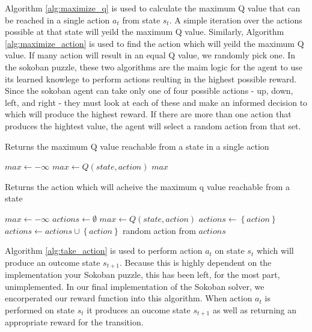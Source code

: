 \documentclass[times, 10pt,twocolumn]{article}
\begin{document}
Algorithm \ref{alg:maximize_q} is used to calculate the maximum Q value that can be reached in a single action $a_t$ from state $s_t$.  A simple iteration over the actions possible at that state will yeild the maximum Q value.  Similarly, Algorithm \ref{alg:maximize_action} is used to find the action which will yeild the maximum Q value.  If many action will result in an equal Q value, we randomly pick one.  In the sokoban puzzle, these two algorithms are the maim logic for the agent to use its learned knowlege to perform actions reulting in the highest possible reward.  Since the sokoban agent can take only one of four possible actions - up, down, left, and right - they must look at each of these and make an informed decision to which will produce the highest reward.  If there are more than one action that produces the hightest value, the agent will select a random action from that set.

\begin{algorithm}
  \caption{Returns the maximum Q value reachable from a state in a single action}
  \begin{algorithmic}[4]
      \State $max\gets -\infty$
          \State $max\gets Q(state, action)$
        \EndIf
      \EndFor
      \State \Return $max$
    \EndFunction
  \end{algorithmic}
  \label{alg:maximize_q}
\end{algorithm}

\begin{algorithm}
  \caption{Returns the action which will acheive the maximum q value reachable from a state}
  \begin{algorithmic}[1]
      \State $max\gets -\infty$
      \State $actions\gets \emptyset$
          \State $max\gets Q(state, action)$
          \State $actions\gets \left\{ {action}\right\}$
        \Else
          \State $actions \gets actions \cup \left\{ {action}\right\}$
        \EndIf
      \EndFor
      \State \Return random action from $actions$
    \EndFunction
  \end{algorithmic}
  \label{alg:maximize_action}
\end{algorithm}

Algorithm \ref{alg:take_action} is used to perform action $a_t$ on state $s_t$ which will produce an outcome state $s_{t+1}$.  Because this is highly dependent on the implementation your Sokoban puzzle, this has been left, for the most part, unimplemented.  In our final implementation of the Sokoban solver, we encorperated our reward function into this algorithm.  When action $a_t$ is performed on state $s_t$ it produces an oucome state $s_{t+1}$ as well as returning an appropriate reward for the transition.
\end{document}
